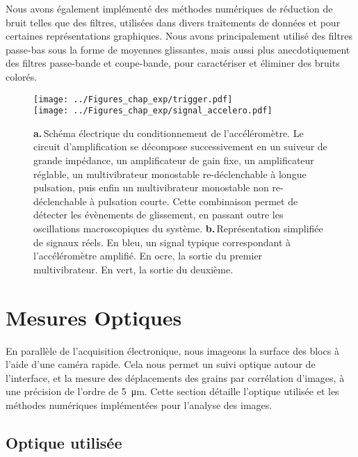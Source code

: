 Nous avons également implémenté des méthodes numériques de réduction de bruit telles que des filtres, utilisées dans divers traitements de données et pour certaines représentations graphiques. Nous avons principalement utilisé des filtres passe-bas sous la forme de moyennes glissantes, mais aussi plus anecdotiquement des filtres passe-bande et coupe-bande, pour caractériser et éliminer des bruits colorés.


\newpage



\begin{figure}[h!]
\centering	
\texttt{[image: ../Figures\_chap\_exp/trigger.pdf]}\\
\texttt{[image: ../Figures\_chap\_exp/signal\_accelero.pdf]}
\caption[Système de déclenchement accélérométrique]{\textbf{a.}\,Schéma électrique du conditionnement de l'accéléromètre. Le circuit d'amplification se décompose successivement en un suiveur de grande impédance, un amplificateur de gain fixe, un amplificateur réglable, un multivibrateur monostable re-déclenchable à longue pulsation, puis enfin un multivibrateur monostable non re-déclenchable à pulsation courte. Cette combinaison permet de détecter les évènements de glissement, en passant outre les oscillations macroscopiques du système.  \textbf{b.}\,Représentation simplifiée de signaux réels. En bleu, un signal typique correspondant à l'accéléromètre amplifié. En ocre, la sortie du premier multivibrateur. En vert, la sortie du deuxième.}
\label{fig:accel}
\end{figure}



\vspace{10mm}

\section{Mesures Optiques}
\label{sec:optique}

En parallèle de l'acquisition électronique, nous imageons la surface des blocs à l'aide d'une caméra rapide. Cela nous permet un suivi optique autour de l'interface, et la mesure des déplacements des grains par corrélation d'images, à une précision de l'ordre de \SI{5}{\micro\meter}. Cette section détaille l'optique utilisée et les méthodes numériques implémentées pour l'analyse des images.

\subsection{Optique utilisée}

